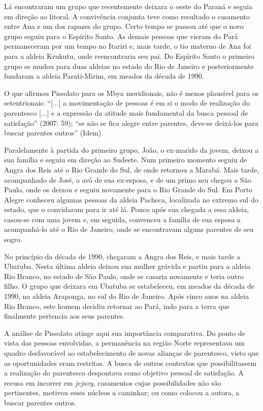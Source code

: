 Lá encontraram um grupo que recentemente deixara o oeste do Paraná e
seguia em direção ao litoral. A convivência conjunta teve como resultado
o casamento entre Ana e um dos rapazes do grupo. Certo tempo se passou
até que o novo grupo seguiu para o Espírito Santo. As demais pessoas que
vieram do Pará permaneceram por um tempo no Itariri e, mais tarde, o tio
materno de Ana foi para a aldeia Krukutu, onde reencontraria seu pai. Do
Espírito Santo o primeiro grupo se mudou para duas aldeias no estado do
Rio de Janeiro e posteriormente fundaram a aldeia Parati-Mirim, em
meados da década de 1990.

O que afirmou Pissolato para os Mbya meridionais, não é menos plausível
para os setentrionais: ``{[}...{]} a movimentação de pessoas é em si o
modo de realização do parentesco {[}...{]} e a expressão da atitude mais
fundamental da busca pessoal de satisfação'' (2007: 59); ``se não se
fica alegre entre parentes, deve-se deixá-los para buscar parentes
outros'' (Idem).

Paralelamente à partida do primeiro grupo, João, o ex-marido da jovem,
deixou a sua família e seguiu em direção ao Sudeste. Num primeiro
momento seguiu de Angra dos Reis até o Rio Grande do Sul, de onde
retornou a Marabá. Mais tarde, acompanhado de José, o avô de sua
ex-esposa, e de um primo seu chegou a São Paulo, onde os deixou e seguiu
novamente para o Rio Grande do Sul. Em Porto Alegre conheceu algumas
pessoas da aldeia Pacheca, localizada no extremo sul do estado, que o
convidaram para ir até lá. Pouco após sua chegada a essa aldeia,
casou-se com uma jovem e, em seguida, convenceu a família de sua esposa
a acompanhá-lo até o Rio de Janeiro, onde se encontravam alguns parentes
de seu sogro.

No princípio da década de 1990, chegaram a Angra dos Reis, e mais tarde
a Ubatuba. Nesta última aldeia deixou sua mulher grávida e partiu para a
aldeia Rio Branco, no estado de São Paulo, onde se casaria novamente e
teria outro filho. O grupo que deixara em Ubatuba se estabeleceu, em
meados da década de 1990, na aldeia Araponga, no sul do Rio de Janeiro.
Após cinco anos na aldeia Rio Branco, este homem decidiu retornar ao
Pará, indo para a terra que finalmente pertencia aos seus parentes.

A análise de Pissolato atinge aqui sua importância comparativa. Do ponto
de vista das pessoas envolvidas, a permanência na região Norte
representava um quadro desfavorável ao estabelecimento de novas alianças
de parentesco, visto que as oportunidades eram restritas. A busca de
outros contextos que possibilitassem a realização do parentesco
despontava como objetivo pessoal de satisfação. A recusa em incorrer em
\emph{jejavy}, casamentos cujas possibilidades não são pertinentes,
motivou esses núcleos a caminhar; ou como colocou a autora, a buscar
parentes outros.

